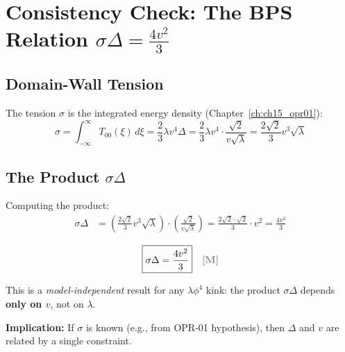 \section{Consistency Check: The BPS Relation $\sigma\Delta = \frac{4v^2}{3}$}
\label{sec:ch16_consistency}

\subsection{Domain-Wall Tension}
\label{subsec:ch16_tension}

The tension $\sigma$ is the integrated energy density (Chapter~\ref{ch:ch15_opr01}):
\begin{equation}
    \sigma = \int_{-\infty}^{\infty} T_{00}(\xi) \, d\xi
    = \frac{2}{3} \lambda v^4 \Delta = \frac{2}{3} \lambda v^4 \cdot \frac{\sqrt{2}}{v\sqrt{\lambda}}
    = \frac{2\sqrt{2}}{3} v^3 \sqrt{\lambda}
    \label{eq:ch16:sigma_explicit}
\end{equation}

\subsection{The Product $\sigma\Delta$}
\label{subsec:ch16_product}

Computing the product:
\begin{align}
    \sigma \Delta &= \left(\frac{2\sqrt{2}}{3} v^3 \sqrt{\lambda}\right) \cdot
    \left(\frac{\sqrt{2}}{v\sqrt{\lambda}}\right)
    = \frac{2\sqrt{2} \cdot \sqrt{2}}{3} \cdot v^2
    = \frac{4 v^2}{3}
    \label{eq:ch16:sigmaDelta}
\end{align}

\begin{tcolorbox}[colback=green!5!white, colframe=green!50!black,
    title=\textbf{BPS Constraint}]
\begin{equation}
    \boxed{\sigma \Delta = \frac{4 v^2}{3}}
    \quad \tagM{}
    \label{eq:ch16:BPS_constraint}
\end{equation}

This is a \emph{model-independent} result for any $\lambda\phi^4$ kink:
the product $\sigma\Delta$ depends \textbf{only on $v$}, not on $\lambda$.

\textbf{Implication:} If $\sigma$ is known (e.g., from OPR-01 hypothesis), then
$\Delta$ and $v$ are related by a single constraint.
\end{tcolorbox}

